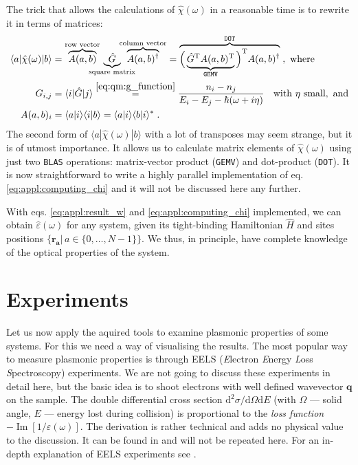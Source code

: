 \documentclass[a4paper,12pt]{article}
\begin{document}
    The trick that allows the calculations of $\hat\chi(\omega)$ in a reasonable time is to rewrite it in terms of matrices:
    \begin{equation} \label{eq:appl:computing_chi}
    \begin{aligned}
        \langle a | \hat\chi(\omega) | b \rangle 
            &= \overbrace{A(a,b)}^\text{row vector}\!\!\!\!\!\!\!\! \underbrace{\hat G}_\text{square matrix}\!\!\!\!\!\!\!\!\!\!\! \overbrace{A(a,b)^\dagger}^\text{column vector}
            = \overbrace{\Big( \underbrace{{\hat G}^\text{T} A(a,b)^\text{T}}_\text{\texttt{GEMV}} \Big)^\text{T} A(a,b)^\dagger}^\text{\texttt{DOT}} \; ,\text{ where} \\
        G_{i,j} &= \langle i | \hat G | j \rangle \overset{\eqref{eq:qm:g_function}}{=} \frac{n_i - n_j}{E_i - E_j - \hbar(\omega + i\eta)} \; \text{\ \ with }\eta\text{ small}, \text{ and}\\
        A(a,b)_i &= \langle a | i \rangle \langle i | b \rangle = \langle a | i \rangle \langle b | i \rangle^* \; .
    \end{aligned}
    \end{equation}
    The second form of $\langle a | \hat \chi(\omega) | b \rangle$ with a lot of transposes may seem strange, but it is of utmost importance. It allows us to calculate matrix elements of $\hat \chi(\omega)$ using just two \texttt{BLAS} operations: matrix-vector product (\texttt{GEMV}) and dot-product (\texttt{DOT}). It is now straightforward to write a highly parallel implementation of eq. \eqref{eq:appl:computing_chi} and it will not be discussed here any further.

    With eqs. \eqref{eq:appl:result_w} and \eqref{eq:appl:computing_chi} implemented, we can obtain $\hat \varepsilon(\omega)$ for any system, given its tight-binding Hamiltonian $\hat H$ and sites positions $\big\{\mathbf{r_a} |\, a \in \{0,\dots,N-1\}\big\}$. We thus, in principle, have complete knowledge of the optical properties of the system.
   
\newpage
\section{Experiments}
    Let us now apply the aquired tools to examine plasmonic properties of some systems. For this we need a way of visualising the results. The most popular way to measure plasmonic properties is through EELS (\textit{E}lectron \textit{E}nergy \textit{L}oss \textit{S}pectroscopy) experiments. We are not going to discuss these experiments in detail here, but the basic idea is to shoot electrons with well defined wavevector $\mathbf{q}$ on the sample. The double differential cross section $\text{d}^2\sigma/\text{d}\Omega\text{d}E$ (with $\Omega$ --- solid angle, $E$ --- energy lost during collision) is proportional to the \textit{loss function} \ $-\operatorname{Im}[1 / \varepsilon(\omega)]$. The derivation is rather technical and adds no physical value to the discussion. It can be found in \cite{jackson1925classical} and will not be repeated here. For an in-depth explanation of EELS experiments see \cite{egerton2009eels}.
\end{document}
